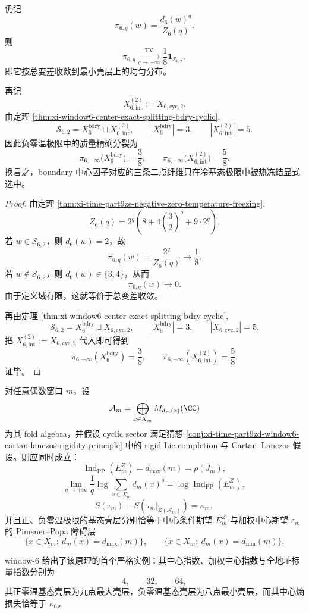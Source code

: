 \begin{theorem}\label{thm:xi-time-part9ze-negative-zero-temp-boundary-interior-splitting}
仍记
\[
\pi_{6,q}(w)=\frac{d_6(w)^q}{Z_6(q)}.
\]
则
\[
\pi_{6,q}\xrightarrow[q\to-\infty]{\mathrm{TV}}
\frac{1}{8}\mathbf 1_{\mathcal S_{6,2}},
\]
即它按总变差收敛到最小壳层上的均匀分布。

再记
\[
X_{6,\mathrm{int}}^{(2)}:=X_{6,\mathrm{cyc},2}.
\]
由定理 \ref{thm:xi-window6-center-exact-splitting-bdry-cyclic},
\[
\mathcal S_{6,2}
=
X_6^{\mathrm{bdry}}\sqcup X_{6,\mathrm{int}}^{(2)},
\qquad
|X_6^{\mathrm{bdry}}|=3,
\qquad
|X_{6,\mathrm{int}}^{(2)}|=5.
\]
因此负零温极限中的质量精确分裂为
\[
\pi_{6,-\infty}\bigl(X_6^{\mathrm{bdry}}\bigr)=\frac38,
\qquad
\pi_{6,-\infty}\bigl(X_{6,\mathrm{int}}^{(2)}\bigr)=\frac58.
\]
换言之，boundary 中心因子对应的三条二点纤维只在冷基态极限中被热冻结显式选中。
\end{theorem}
\begin{proof}
由定理 \ref{thm:xi-time-part9ze-negative-zero-temperature-freezing},
\[
Z_6(q)=2^q\left(8+4\left(\frac32\right)^q+9\cdot 2^q\right).
\]
若 \(w\in \mathcal S_{6,2}\)，则 \(d_6(w)=2\)，故
\[
\pi_{6,q}(w)=\frac{2^q}{Z_6(q)}\longrightarrow \frac18.
\]
若 \(w\notin \mathcal S_{6,2}\)，则 \(d_6(w)\in\{3,4\}\)，从而
\[
\pi_{6,q}(w)\longrightarrow 0.
\]
由于定义域有限，这就等价于总变差收敛。

再由定理 \ref{thm:xi-window6-center-exact-splitting-bdry-cyclic},
\[
\mathcal S_{6,2}=X_6^{\mathrm{bdry}}\sqcup X_{6,\mathrm{cyc},2},
\qquad
|X_6^{\mathrm{bdry}}|=3,
\qquad
|X_{6,\mathrm{cyc},2}|=5.
\]
把 \(X_{6,\mathrm{int}}^{(2)}:=X_{6,\mathrm{cyc},2}\) 代入即可得到
\[
\pi_{6,-\infty}(X_6^{\mathrm{bdry}})=\frac38,
\qquad
\pi_{6,-\infty}(X_{6,\mathrm{int}}^{(2)})=\frac58.
\]
证毕。
\end{proof}

\begin{conjecture}\label{conj:xi-time-part9ze-jones-freeze-entropy-rigidity}
对任意偶数窗口 \(m\)，设
\[
\mathcal A_m=\bigoplus_{x\in X_m}M_{d_m(x)}(\CC)
\]
为其 fold algebra，并假设 cyclic sector 满足猜想
\ref{conj:xi-time-part9zd-window6-cartan-lanczos-rigidity-principle}
中的 rigid Lie completion 与 Cartan--Lanczos 假设。则应同时成立：
\[
\operatorname{Ind}_{\mathrm{PP}}(E_m^Z)=d_{\max}(m)=\rho(J_m),
\]
\[
\lim_{q\to+\infty}\frac1q\log\sum_{x\in X_m}d_m(x)^q
=
\log\operatorname{Ind}_{\mathrm{PP}}(E_m^Z),
\]
\[
S(\tau_m)-S(\tau_m|_{Z(\mathcal A_m)})=\kappa_m,
\]
并且正、负零温极限的基态壳层分别恰等于中心条件期望 \(E_m^Z\) 与加权中心期望 \(\varepsilon_m\) 的 Pimsner--Popa 障碍层
\[
\{x\in X_m:\ d_m(x)=d_{\max}(m)\},
\qquad
\{x\in X_m:\ d_m(x)=d_{\min}(m)\}.
\]

window-\(6\) 给出了该原理的首个严格实例：其中心指数、加权中心指数与全地址标量指数分别为
\[
4,\qquad 32,\qquad 64,
\]
其正零温基态壳层为九点最大壳层，负零温基态壳层为八点最小壳层，而其中心熵损失恰等于 \(\kappa_6\)。
\end{conjecture}

